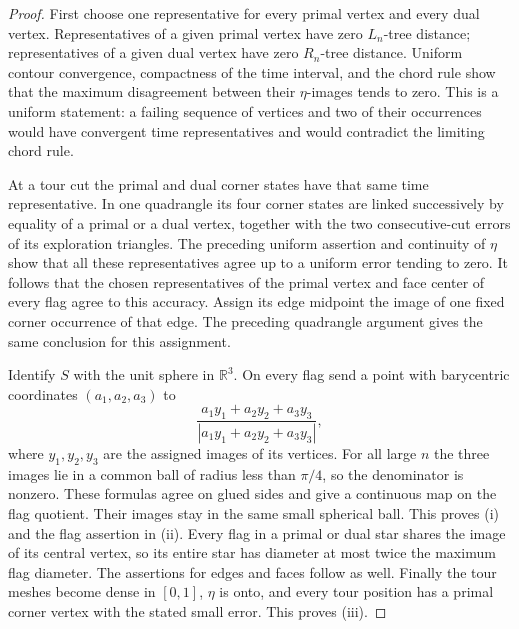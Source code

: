 \documentclass[11pt]{article}
\numberwithin{equation}{section}
\theoremstyle{definition}
\theoremstyle{remark}
\newcommand{\R}{\mathbb R}
\newcommand{\1}{\mathbf 1}
\begin{document}
\begin{proof}
First choose one representative for every primal vertex and every dual
vertex.  Representatives of a given primal vertex have zero
$L_n$-tree distance; representatives of a given dual vertex have zero
$R_n$-tree distance.  Uniform contour convergence, compactness of the
time interval, and the chord rule show that the maximum disagreement
between their $\eta$-images tends to zero.  This is a uniform statement:
a failing sequence of vertices and two of their occurrences would have
convergent time representatives and would contradict the limiting chord
rule.

At a tour cut the primal and dual corner states have that same time
representative.  In one quadrangle its four corner states are linked
successively by equality of a primal or a dual vertex, together with the
two consecutive-cut errors of its exploration triangles.  The preceding
uniform assertion and continuity of $\eta$ show that all these
representatives agree up to a uniform error tending to zero.  It follows
that the chosen representatives of the primal vertex and face center
of every flag agree to this accuracy.  Assign its edge midpoint the
image of one fixed corner occurrence of that edge.  The preceding
quadrangle argument gives the same conclusion for this assignment.

Identify $S$ with the unit sphere in $\R^3$.  On every flag send a point
with barycentric coordinates $(a_1,a_2,a_3)$ to
\[
 \frac{a_1 y_1+a_2 y_2+a_3 y_3}
 {|a_1 y_1+a_2 y_2+a_3 y_3|},
\]
where $y_1,y_2,y_3$ are the assigned images of its vertices.  For all
large $n$ the three images lie in a common ball of radius less than
$\pi/4$, so the denominator is nonzero.  These formulas agree on glued
sides and give a continuous map on the flag quotient.  Their images
stay in the same small spherical ball.  This proves (i) and the flag
assertion in (ii).  Every flag in a primal or dual star shares the
image of its central vertex, so its entire star has diameter at most
twice the maximum flag diameter.  The assertions for edges and faces
follow as well.  Finally the tour meshes become dense in $[0,1]$,
$\eta$ is onto, and every tour position has a primal corner vertex
with the stated small error.  This proves (iii).
\end{proof}
\end{document}
